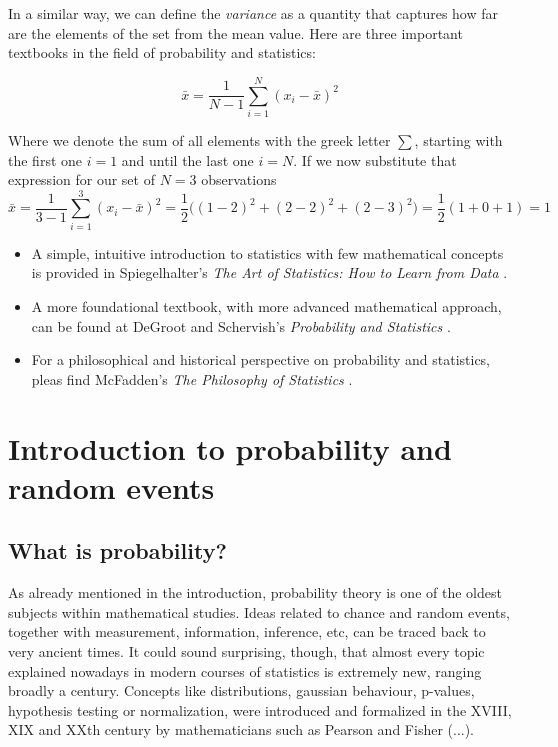 \documentclass{book}
\begin{document}
In a similar way, we can define the \textit{variance} as a quantity that captures how far are the elements of the set from the mean value.
Here are three important textbooks in the field of probability and statistics:

\begin{equation}
\bar{x} = \frac{1}{N - 1} \sum_{i = 1}^{N} (x_{i} - \bar{x})^{2}
\end{equation}

Where we denote the sum of all elements with the greek letter $\sum$, starting with the first one $i = 1$ and until the last one $i = N$. If we now substitute that expression for our set of $N = 3$ observations
\begin{equation}
\bar{x} = \frac{1}{3 - 1} \sum_{i = 1}^{3} (x_{i} - \bar{x})^{2} = \frac{1}{2} \big((1 - 2)^{2} + (2 - 2)^{2} + (2 - 3)^{2}\big) = \frac{1}{2} (1 + 0 + 1) = 1
\end{equation}

\begin{itemize}
\item A simple, intuitive introduction to statistics with few mathematical concepts is provided in Spiegelhalter's \textit{The Art of Statistics: How to Learn from Data} \cite{spiegelhalter2019art}. 
\item A more foundational textbook, with more advanced mathematical approach, can be found at DeGroot and Schervish's \textit{Probability and Statistics} \cite{degroot2012probability}.   
\item For a philosophical and historical perspective on probability and statistics, pleas find McFadden's \textit{The Philosophy of Statistics} \cite{mcfadden2011philosophy}.
\end{itemize}

\chapter{Introduction to probability and random events}

\section{What is probability?}
As already mentioned in the introduction, probability theory is one of the oldest subjects within mathematical studies. Ideas related to chance and random events, together with measurement, information, inference, etc, can be traced back to very ancient times. It could sound surprising, though, that almost every topic explained nowadays in modern courses of statistics is extremely new, ranging broadly a century. Concepts like distributions, gaussian behaviour, p-values, hypothesis testing or normalization, were introduced and formalized in the XVIII, XIX and XXth century by mathematicians such as Pearson and Fisher (...).\\
\end{document}
